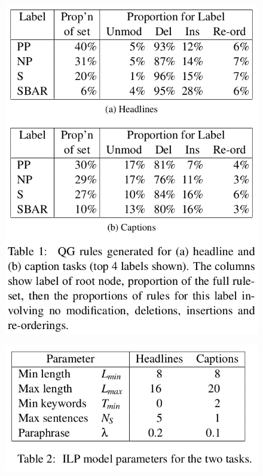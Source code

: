 \documentclass[xcolor={table}]{beamer}
\begin{document}
\begin{frame}[t]{\cite{woodsend2010generation}}
      \begin{figure}[h]
          \centering
      \includegraphics[scale=.25]{images/table1-woodsend10} \\
  \end{figure}
\end{frame}

\begin{frame}[t]{\cite{woodsend2010generation}}
      \begin{figure}[h]
          \centering
      \includegraphics[scale=.25]{images/table2-woodsend10} \\
  \end{figure}
\end{frame}
\end{document}
